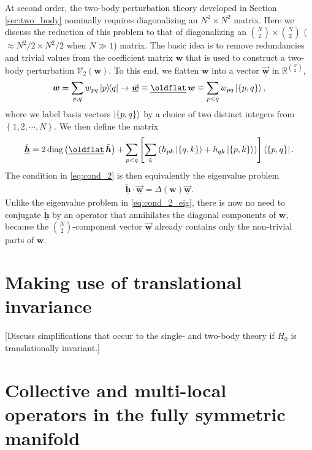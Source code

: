 \documentclass[nofootinbib,notitlepage,11pt]{revtex4-2}
\newcommand{\p}[1]{\left(#1\right)} %
\renewcommand{\sp}[1]{\left[#1\right]} %
\renewcommand{\set}[1]{\left\{#1\right\}} %
\renewcommand{\c}{\cdot} %
\newcommand{\m}{\bm} %
\renewcommand{\v}{\vec} %
\newcommand{\1}{\mathds{1}}
\newcommand{\V}{\mathcal{V}}
\newcommand{\RR}{\mathbb{R}}
\DeclareMathOperator{\diag}{diag}
\let\flat\oldflat
\DeclareMathOperator{\flat}{flat}
\newcommand{\flatvec}{\underline\flat\,}
\newcommand{\ul}{\underline}
\begin{document}
At second order, the two-body perturbation theory developed in Section
\ref{sec:two_body} nominally requires diagonalizing an $N^2\times N^2$
matrix.  Here we discuss the reduction of this problem to that of
diagonalizing an ${N \choose 2} \times {N \choose 2}$
($\approx N^2/2\times N^2/2$ when $N\gg1$) matrix.  The basic idea is
to remove redundancies and trivial values from the coefficient matrix
$\m w$ that is used to construct a two-body perturbation
$\V_2\p{\m w}$.  To this end, we flatten $\m w$ into a vector
$\ul{\v{\m w}}$ in $\RR^{N\choose2}$,
\begin{align}
  \m w = \sum_{p,q} w_{pq} \op{p}{q}
  \to \ul{\v{\m w}} \equiv \flatvec\m w
  \equiv \sum_{p<q} w_{pq} \ket{\set{p,q}},
\end{align}
where we label basis vectors $\ket{\set{p,q}}$ by a choice of two
distinct integers from $\set{1,2,\cdots,N}$.  We then define the
matrix
\begin{align}
  \ul{\check{\m h}} = 2\diag\p{\flatvec\bar{\m h}}
  + \sum_{p<q}
  \sp{\sum_k \p{h_{pk} \ket{\set{q,k}} + h_{qk} \ket{\set{p,k}}}}
  \bra{\set{p,q}}.
\end{align}
The condition in \eqref{eq:cond_2} is then equivalently the eigenvalue
problem
\begin{align}
  \ul{\check{\m h}} \c \ul{\v{\m w}}
  = \Delta\p{\m w} \ul{\v{\m w}}.
\end{align}
Unlike the eigenvalue problem in \eqref{eq:cond_2_eig}, there is now
no need to conjugate $\ul{\check{\m h}}$ by an operator that
annihilates the diagonal components of $\m w$, because the
${N\choose2}$-component vector $\ul{\v{\m w}}$ already contains only
the non-trivial parts of $\m w$.

\section{Making use of translational invariance}
\label{sec:trans_inv}

[Discuss simplifications that occur to the single- and two-body theory
if $H_0$ is translationally invariant.]

\section{Collective and multi-local operators in the fully symmetric
  manifold}
\label{sec:multi_to_collective}
\end{document}
